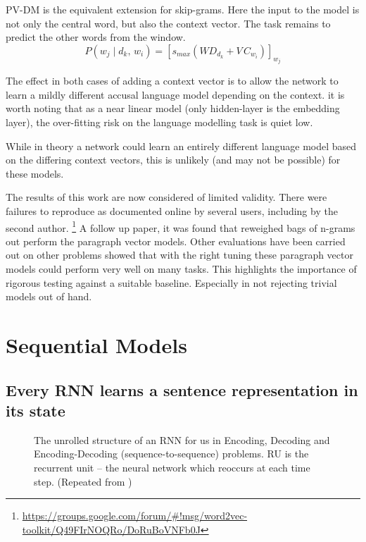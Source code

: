 \documentclass[12pt,parskip]{komatufte}
\begin{document}
PV-DM is the equivalent extension for skip-grams.
Here the input to the model is not only the central word, but also the context vector.
The task remains to predict the other words from the window.
\begin{equation}
P(w_j \mid d_k,\, w_{i}) = \left[ s_{max}(WD_{d_k} + V\,C_{w_{i}}) \right]_{w_j} 
\end{equation}

The effect in both cases of adding a context vector is to allow the network to learn a mildly different accusal language model depending on the context.
it is worth noting that as a near linear model (only hidden-layer is the embedding layer), the over-fitting risk on the language modelling task is quiet low.

While in theory a network could learn an entirely different language model based on the differing context vectors,
this is unlikely (and may not be possible) for these models. 




The results of this work are now considered of limited validity.
There were failures to reproduce as documented online by several users,
including by the second author.
 \footnote{ \url{https://groups.google.com/forum/\#!msg/word2vec-toolkit/Q49FIrNOQRo/DoRuBoVNFb0J}}
A follow up paper,  it was found that reweighed bags of n-grams  out perform the paragraph vector models.
Other evaluations have been carried out on other problems \textcite{lau2016doc2vecissues} showed that with the right tuning these paragraph vector models could perform very well on many tasks.
This highlights the importance of rigorous testing against a suitable baseline.
Especially in not rejecting trivial models out of hand.






\section{Sequential Models}

\subsection{Every RNN learns a sentence representation in its state}
\begin{figure}
	\caption{The unrolled structure of an RNN for us in Encoding, Decoding and Encoding-Decoding (sequence-to-sequence) problems. RU is the recurrent unit -- the neural network which reoccurs at each time step. (Repeated from )
	}
	
	\label{fig-rnns-sq}
	
	\resizebox{\textwidth}{!}{}
\end{figure}
\end{document}
